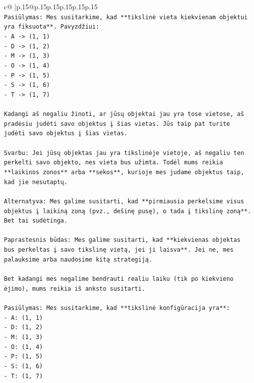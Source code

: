 \documentclass{article}
\begin{document}
{\begin{supertabular}{c@{$\;$}|p{.15\linewidth}@{}p{.15\linewidth}p{.15\linewidth}p{.15\linewidth}p{.15\linewidth}p{.15\linewidth}}
{{{\\ 
\texttt{Pasiūlymas: Mes susitarkime, kad **tikslinė vieta kiekvienam objektui yra fiksuota**. Pavyzdžiui:} \\
\texttt{{-} A {-}> (1, 1)} \\
\texttt{{-} D {-}> (1, 2)} \\
\texttt{{-} M {-}> (1, 3)} \\
\texttt{{-} O {-}> (1, 4)} \\
\texttt{{-} P {-}> (1, 5)} \\
\texttt{{-} S {-}> (1, 6)} \\
\texttt{{-} T {-}> (1, 7)} \\
\\ 
\texttt{Kadangi aš negaliu žinoti, ar jūsų objektai jau yra tose vietose, aš pradėsiu judėti savo objektus į šias vietas. Jūs taip pat turite judėti savo objektus į šias vietas.} \\
\\ 
\texttt{Svarbu: Jei jūsų objektas jau yra tikslinėje vietoje, aš negaliu ten perkelti savo objekto, nes vieta bus užimta. Todėl mums reikia **laikinos zonos** arba **sekos**, kurioje mes judame objektus taip, kad jie nesutaptų.} \\
\\ 
\texttt{Alternatyva: Mes galime susitarti, kad **pirmiausia perkelsime visus objektus į laikiną zoną (pvz., dešinę pusę), o tada į tikslinę zoną**. Bet tai sudėtinga.} \\
\\ 
\texttt{Paprastesnis būdas: Mes galime susitarti, kad **kiekvienas objektas bus perkeltas į savo tikslinę vietą, jei ji laisva**. Jei ne, mes palauksime arba naudosime kitą strategiją.} \\
\\ 
\texttt{Bet kadangi mes negalime bendrauti realiu laiku (tik po kiekvieno ėjimo), mums reikia iš anksto susitarti.} \\
\\ 
\texttt{Pasiūlymas: Mes susitarkime, kad **tikslinė konfigūracija yra**:} \\
\texttt{{-} A: (1, 1)} \\
\texttt{{-} D: (1, 2)} \\
\texttt{{-} M: (1, 3)} \\
\texttt{{-} O: (1, 4)} \\
\texttt{{-} P: (1, 5)} \\
\texttt{{-} S: (1, 6)} \\
\texttt{{-} T: (1, 7)} \\
}}}
\end{supertabular}}
\end{document}
